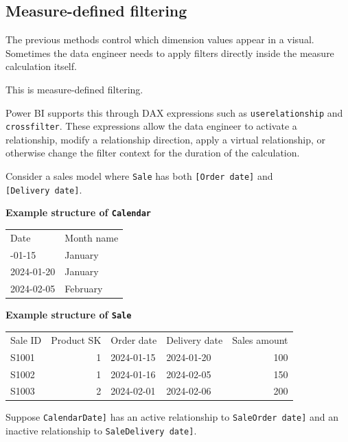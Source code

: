 \documentclass[10pt,openany,10pt]{book}
\newcounter{none}
\let\podeToprule\toprule
\let\podeMidrule\midrule
\let\podeBottomrule\bottomrule
\renewcommand{\toprule}{\arrayrulecolor{pbiGrid}\podeToprule}
\renewcommand{\midrule}{\arrayrulecolor{pbiGrid}\podeMidrule}
\renewcommand{\bottomrule}{\arrayrulecolor{pbiGrid}\podeBottomrule}
\begin{document}
\subsection{Measure-defined filtering}\label{measure-defined-filtering}

The previous methods control which dimension values appear in a visual.
Sometimes the data engineer needs to apply filters directly inside the
measure calculation itself.

This is measure-defined filtering.

Power BI supports this through DAX expressions such as
\texttt{userelationship} and \texttt{crossfilter}. These expressions
allow the data engineer to activate a relationship, modify a
relationship direction, apply a virtual relationship, or otherwise
change the filter context for the duration of the calculation.

Consider a sales model where
\texttt{\textquotesingle{}Sale\textquotesingle{}} has both
\texttt{{[}Order\ date{]}} and \texttt{{[}Delivery\ date{]}}.

\textbf{Example structure of
\texttt{\textquotesingle{}Calendar\textquotesingle{}}}

{\def\LTcaptype{none} %
\begin{longtable}[]{@{}ll@{}}
\toprule\noalign{}
Date & Month name \\
\midrule\noalign{}
\endhead
\bottomrule\noalign{}
\endlastfoot
2024-01-15 & January \\
2024-01-20 & January \\
2024-02-05 & February \\
\end{longtable}
}

\textbf{Example structure of
\texttt{\textquotesingle{}Sale\textquotesingle{}}}

{\def\LTcaptype{none} %
\begin{longtable}[]{@{}lrllr@{}}
\toprule\noalign{}
Sale ID & Product SK & Order date & Delivery date & Sales amount \\
\midrule\noalign{}
\endhead
\bottomrule\noalign{}
\endlastfoot
S1001 & 1 & 2024-01-15 & 2024-01-20 & 100 \\
S1002 & 1 & 2024-01-16 & 2024-02-05 & 150 \\
S1003 & 2 & 2024-02-01 & 2024-02-06 & 200 \\
\end{longtable}
}

Suppose \texttt{\textquotesingle{}Calendar\textquotesingle{}{[}Date{]}}
has an active relationship to
\texttt{\textquotesingle{}Sale\textquotesingle{}{[}Order\ date{]}} and
an inactive relationship to
\texttt{\textquotesingle{}Sale\textquotesingle{}{[}Delivery\ date{]}}.
\end{document}
